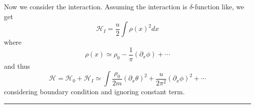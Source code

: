 Now we consider the interaction. Assuming the interaction is $\delta$-function like, we get
\begin{equation}
\mathcal{H}_I=\frac{u}{2}\int \rho(x)^2 dx
\end{equation}
where
\begin{equation}
\rho(x)\simeq \rho_0-\frac{1}{\pi}(\partial_x\phi)+\cdots
\end{equation}
and thus
\begin{equation}
\mathcal{H}=\mathcal{H}_0+\mathcal{H}_I\simeq \int \frac{\rho_0}{2m}(\partial_x\theta)^2+\frac{u}{2\pi^2}(\partial_x\phi)^2+\cdots
\end{equation}
considering boundary condition and ignoring constant term.

\noindent\rule{\textwidth}{1pt}
\newline